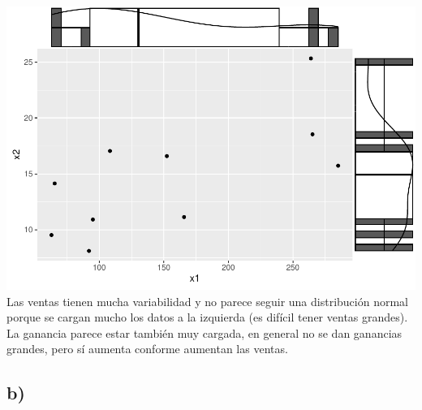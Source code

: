 \documentclass[
]{article}
\begin{document}
\includegraphics{Tarea1_files/figure-latex/unnamed-chunk-7-1.pdf} Las
ventas tienen mucha variabilidad y no parece seguir una distribución
normal porque se cargan mucho los datos a la izquierda (es difícil tener
ventas grandes). La ganancia parece estar también muy cargada, en
general no se dan ganancias grandes, pero sí aumenta conforme aumentan
las ventas.

\hypertarget{b-1}{%
\subsection{b)}\label{b-1}}
\end{document}
